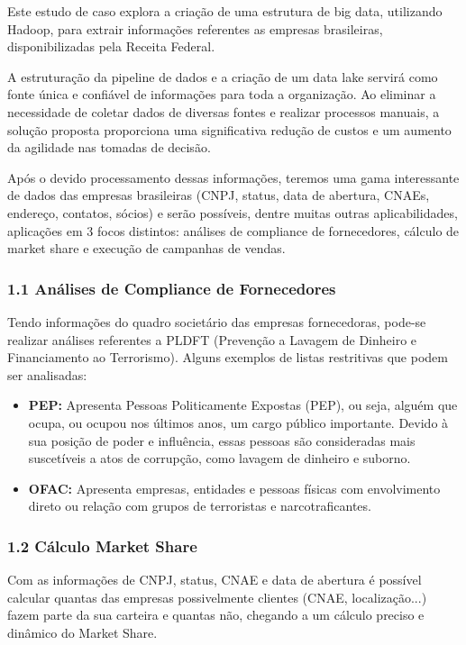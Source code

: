 Este estudo de caso explora a criação de uma estrutura de big data, utilizando Hadoop, para extrair informações referentes as empresas brasileiras, disponibilizadas pela Receita Federal.

A estruturação da pipeline de dados e a criação de um data lake servirá como fonte única e confiável de informações para toda a organização. Ao eliminar a necessidade de coletar dados de diversas fontes e realizar processos manuais, a solução proposta proporciona uma significativa redução de custos e um aumento da agilidade nas tomadas de decisão.

Após o devido processamento dessas informações, teremos uma gama interessante de dados das empresas brasileiras (CNPJ, status, data de abertura, CNAEs, endereço, contatos, sócios) e serão possíveis, dentre muitas outras aplicabilidades, aplicações em 3 focos distintos: análises de compliance de fornecedores, cálculo de market share e execução de campanhas de vendas.


\subsubsection*{1.1 Análises de Compliance de Fornecedores}
Tendo informações do quadro societário das empresas fornecedoras, pode-se realizar análises referentes a PLDFT (Prevenção a Lavagem de Dinheiro e Financiamento ao Terrorismo). Alguns exemplos de listas restritivas que podem ser analisadas: 

\begin{itemize}
    \item \textbf{PEP:} Apresenta Pessoas Politicamente Expostas (PEP), ou seja, alguém que ocupa, ou ocupou nos últimos anos, um cargo público importante. Devido à sua posição de poder e influência, essas pessoas são consideradas mais suscetíveis a atos de corrupção, como lavagem de dinheiro e suborno.
    \item \textbf{OFAC:} Apresenta empresas, entidades e pessoas físicas com envolvimento direto ou relação com grupos de terroristas e narcotraficantes.  
\end{itemize}

\subsubsection*{1.2 Cálculo Market Share}
Com as informações de CNPJ, status, CNAE e data de abertura é possível calcular quantas das empresas possivelmente clientes (CNAE, localização...) fazem parte da sua carteira e quantas não, chegando a um cálculo preciso e dinâmico do Market Share. 

